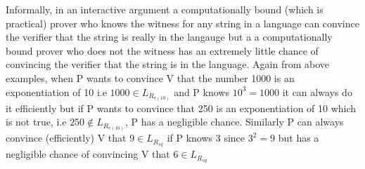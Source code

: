 \documentclass[a4paper]{article}
\begin{document}
Informally, in an interactive argument a computationally bound (which is practical) prover who knows the witness for any string in a language can convince the verifier that the string is really in the langauge but a a computationally bound prover who does not the witness has an extremely little chance of convincing the verifier that the string is in the language. Again from above examples, when P wants to convince V that the number 1000 is an exponentiation of 10 i.e $ 1000 \in L_{R_{e(10)}} $ and P knows $ 10^3 = 1000 $ it can always do it efficiently but if P wants to convince that 250 is an exponentiation of 10 which is not true, i.e $ 250 \notin \textit{$L_{R_{e(10)}}$} $, P has a negligible chance. Similarly P can always convince (efficiently) V that $ 9 \in L_{R_{sq}} $ if P knows 3 since $3^2 = 9$ but has a negligible chance of convincing V that $ 6 \in L_{R_{sq}} $
\end{document}

